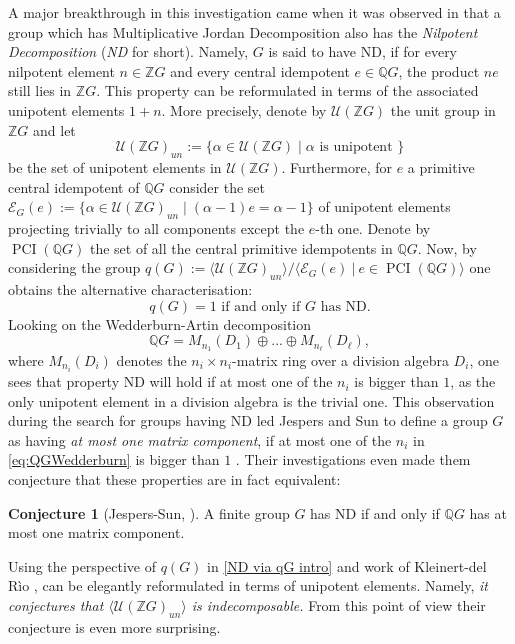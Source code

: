 \documentclass[a4paper,10pt]{amsart}
\theoremstyle{definition}
\newtheorem{conjecture}[lemma]{Conjecture}
\theoremstyle{remark}
\newcommand\PCI{\operatorname{PCI}}
\newcommand{\U}{{\mathcal U}}
\newcommand{\Z}{{\mathbb Z}}
\newcommand{\Q}{{\mathbb Q}}
\begin{document}
A major breakthrough in this investigation came when it was observed in \cite{HPW} that a group which has Multiplicative Jordan Decomposition also has the \emph{Nilpotent Decomposition} (\emph{ND} for short). Namely, $G$ is said to have ND, if for every nilpotent element $n \in \mathbb{Z}G$ and every central idempotent $e \in \mathbb{Q}G$, the product $ne$ still lies in $\mathbb{Z}G$. This property can be reformulated in terms of the associated unipotent elements $1+n$. More precisely, denote by $\U( \Z G)$ the unit group in $\Z G$ and let 
$$ \U(\Z G)_{un} := \{ \alpha \in \U (\Z G) \mid \alpha \text{ is unipotent } \}$$
be the set of unipotent elements in $\U (\Z G)$. Furthermore, for $e$ a primitive central idempotent of $\Q G$ consider the set $\mathcal{E}_G(e) := \{ \alpha \in \U(\Z G)_{un} \mid (\alpha -1) e = \alpha -1\}$ of unipotent elements projecting trivially to all components except the $e$-th one. Denote by $\PCI( \Q G)$ the set of all the central primitive idempotents in $\Q G$. Now, by considering the group $q(G) := \langle  \U(\Z G)_{un} \rangle / \langle \mathcal{E}_G(e) \ | \ e \in \PCI(\Q G) \rangle$ one obtains the alternative characterisation:
\begin{equation}\label{ND via qG intro}
q(G) = 1 \text{ if and only if } G \text{ has ND}.
\end{equation}
Looking on the Wedderburn-Artin decomposition 
\begin{equation}\label{eq:QGWedderburn}
\mathbb{Q}G = M_{n_1}(D_1) \oplus ... \oplus M_{n_\ell}(D_\ell),
\end{equation}
 where $M_{n_i}(D_i)$ denotes the $n_i\times n_i$-matrix ring over a division algebra $D_i$, one sees that property ND will hold if at most one of the $n_i$ is bigger than $1$, as the only unipotent element in a division algebra is the trivial one. This observation during the search for groups having ND led Jespers and Sun to define a group  $G$ as having \emph{at most one matrix component}, if at most one of the $n_i$ in \eqref{eq:QGWedderburn} is bigger than $1$ \cite{JespersSun}. 
Their investigations even made them conjecture that these properties are in fact equivalent:

\begin{conjecture}[{Jespers-Sun, \cite[Conjecture 1]{JespersSun}}]\label{conj:EricWei}
 A finite group $G$ has ND if and only if $\mathbb{Q}G$ has at most one matrix component.
\end{conjecture}  

Using the perspective of $q(G)$ in \eqref{ND via qG intro} and work of Kleinert-del R\`io \cite{KleRio},  can be elegantly reformulated in terms of unipotent elements. Namely, {\it it conjectures that $\langle \mathcal{U}(\Z G)_{un} \rangle$ is indecomposable.} From this point of view their conjecture is even more surprising.
\end{document}
